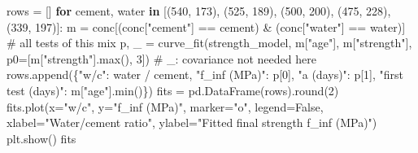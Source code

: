 \documentclass[
  letterpaper,
  DIV=11,
  numbers=noendperiod]{scrreprt}
\newenvironment{Shaded}{\begin{snugshade}}{\end{snugshade}}
\newcommand{\BuiltInTok}[1]{\textcolor[rgb]{0.00,0.23,0.31}{#1}}
\newcommand{\CommentTok}[1]{\textcolor[rgb]{0.37,0.37,0.37}{#1}}
\newcommand{\ControlFlowTok}[1]{\textcolor[rgb]{0.00,0.23,0.31}{\textbf{#1}}}
\newcommand{\DecValTok}[1]{\textcolor[rgb]{0.68,0.00,0.00}{#1}}
\newcommand{\KeywordTok}[1]{\textcolor[rgb]{0.00,0.23,0.31}{\textbf{#1}}}
\newcommand{\NormalTok}[1]{\textcolor[rgb]{0.00,0.23,0.31}{#1}}
\newcommand{\OperatorTok}[1]{\textcolor[rgb]{0.37,0.37,0.37}{#1}}
\newcommand{\StringTok}[1]{\textcolor[rgb]{0.13,0.47,0.30}{#1}}
\newcommand{\VariableTok}[1]{\textcolor[rgb]{0.07,0.07,0.07}{#1}}
\begin{document}
\begin{tcolorbox}[enhanced jigsaw, left=2mm, title=\textcolor{quarto-callout-caution-color}{\faFire}\hspace{0.5em}{Solution to Exercise 4}, opacityback=0, breakable, rightrule=.15mm, arc=.35mm, toptitle=1mm, colbacktitle=quarto-callout-caution-color!10!white, opacitybacktitle=0.6, coltitle=black, colframe=quarto-callout-caution-color-frame, bottomrule=.15mm, leftrule=.75mm, bottomtitle=1mm, titlerule=0mm, toprule=.15mm, colback=white]

\begin{Shaded}
\begin{Highlighting}[]
\NormalTok{rows }\OperatorTok{=}\NormalTok{ []}
\ControlFlowTok{for}\NormalTok{ cement, water }\KeywordTok{in}\NormalTok{ [(}\DecValTok{540}\NormalTok{, }\DecValTok{173}\NormalTok{), (}\DecValTok{525}\NormalTok{, }\DecValTok{189}\NormalTok{), (}\DecValTok{500}\NormalTok{, }\DecValTok{200}\NormalTok{), (}\DecValTok{475}\NormalTok{, }\DecValTok{228}\NormalTok{), (}\DecValTok{339}\NormalTok{, }\DecValTok{197}\NormalTok{)]:}
\NormalTok{    m }\OperatorTok{=}\NormalTok{ conc[(conc[}\StringTok{"cement"}\NormalTok{] }\OperatorTok{==}\NormalTok{ cement) }\OperatorTok{\&}\NormalTok{ (conc[}\StringTok{"water"}\NormalTok{] }\OperatorTok{==}\NormalTok{ water)]          }\CommentTok{\# all tests of this mix}
\NormalTok{    p, \_ }\OperatorTok{=}\NormalTok{ curve\_fit(strength\_model, m[}\StringTok{"age"}\NormalTok{], m[}\StringTok{"strength"}\NormalTok{],}
\NormalTok{                     p0}\OperatorTok{=}\NormalTok{[m[}\StringTok{"strength"}\NormalTok{].}\BuiltInTok{max}\NormalTok{(), }\DecValTok{3}\NormalTok{])                         }\CommentTok{\# \_: covariance not needed here}
\NormalTok{    rows.append(\{}\StringTok{"w/c"}\NormalTok{: water }\OperatorTok{/}\NormalTok{ cement, }\StringTok{"f\_inf (MPa)"}\NormalTok{: p[}\DecValTok{0}\NormalTok{], }\StringTok{"a (days)"}\NormalTok{: p[}\DecValTok{1}\NormalTok{],}
                 \StringTok{"first test (days)"}\NormalTok{: m[}\StringTok{"age"}\NormalTok{].}\BuiltInTok{min}\NormalTok{()\})}
\NormalTok{fits }\OperatorTok{=}\NormalTok{ pd.DataFrame(rows).}\BuiltInTok{round}\NormalTok{(}\DecValTok{2}\NormalTok{)}
\NormalTok{fits.plot(x}\OperatorTok{=}\StringTok{"w/c"}\NormalTok{, y}\OperatorTok{=}\StringTok{"f\_inf (MPa)"}\NormalTok{, marker}\OperatorTok{=}\StringTok{"o"}\NormalTok{, legend}\OperatorTok{=}\VariableTok{False}\NormalTok{,}
\NormalTok{          xlabel}\OperatorTok{=}\StringTok{"Water/cement ratio"}\NormalTok{, ylabel}\OperatorTok{=}\StringTok{"Fitted final strength f\_inf (MPa)"}\NormalTok{)}
\NormalTok{plt.show()}
\NormalTok{fits}
\end{Highlighting}
\end{Shaded}


\end{tcolorbox}
\end{document}
